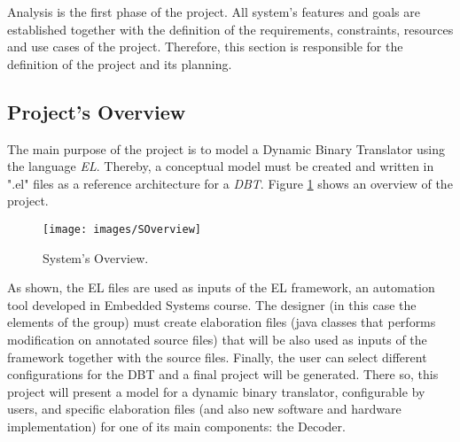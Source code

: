 Analysis is the first phase of the project. All system's features and goals are established together with the definition of the requirements, constraints, resources and use cases of the project. Therefore, this section is responsible for the definition of the project and its planning.

\subsection{Project's Overview}
The main purpose of the project is to model a Dynamic Binary Translator using the language \textit{EL}. Thereby, a conceptual model must be created and written in ".el" files as a reference architecture for a \textit{DBT}. Figure \ref{fig:SOverview} shows an overview of the project.

\begin{figure}[!htb]
\centering
\texttt{[image: images/SOverview]}
\caption{System's Overview.}
\label{fig:SOverview} 
\end{figure}

As shown, the EL files are used as inputs of the EL framework, an automation tool developed in Embedded Systems course. The designer (in this case the elements of the group) must create elaboration files (java classes that performs modification on annotated source files) that will be also used as inputs of the framework together with the source files. Finally, the user can select different configurations for the DBT and a final project will be generated.
There so, this project will present a model for a dynamic binary translator, configurable by users, and specific elaboration files (and also new software and hardware implementation) for one of its main components: the Decoder.



